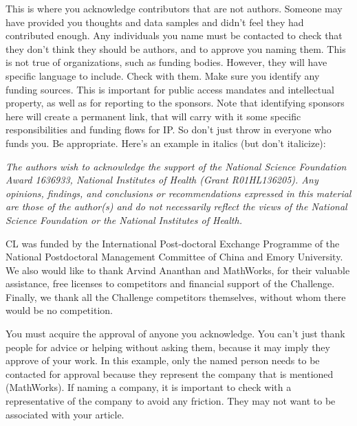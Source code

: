 This is where you acknowledge contributors that are not authors. Someone may have provided you thoughts and data samples and didn't feel they had contributed enough. Any individuals you name must be contacted to check that they don't think they should be authors, and to approve you naming them. This is not true of organizations, such as funding bodies. However, they will have specific language to include. Check with them. Make sure you identify any funding sources. This is important for public access mandates and intellectual property, as well as for reporting to the sponsors. Note that identifying sponsors here will create a permanent link, that will carry with it some specific responsibilities and funding flows for IP. So don't just throw in everyone who funds you. Be appropriate. Here's an example in italics (but don't italicize):

{\it
The authors wish to acknowledge the support of the National Science Foundation Award 1636933, National Institutes of Health (Grant R01HL136205). Any opinions, findings, and conclusions or recommendations expressed in this material are those of the author(s) and do not necessarily reflect the views of the National Science Foundation or the National Institutes of Health.

CL was funded by the International Post-doctoral Exchange Programme of the National Postdoctoral Management Committee of China and Emory University. We also would like to thank Arvind Ananthan and MathWorks, for their valuable assistance, free licenses to competitors and financial support of the Challenge.  Finally, we thank all the Challenge competitors themselves, without whom there would be no competition. } 

You must acquire the approval of anyone you acknowledge. You can't just thank people for advice or helping without asking them, because it may imply they approve of your work.
In this example, only the named person needs to be contacted for approval because they represent the company that is mentioned (MathWorks). If naming a company, it is important to check with a representative of the company to avoid any friction. They may not want to be associated with your article.

